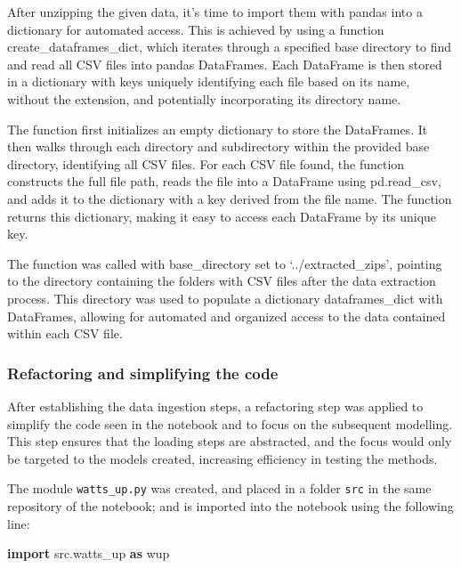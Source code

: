 \documentclass[mstat,12pt]{unswthesis}
\newenvironment{Shaded}{}{}
\newcommand{\ImportTok}[1]{\textcolor[rgb]{0.00,0.50,0.00}{\textbf{#1}}}
\newcommand{\NormalTok}[1]{#1}
\begin{document}
After unzipping the given data, it's time to import them with pandas
into a dictionary for automated access. This is achieved by using a
function create\_dataframes\_dict, which iterates through a specified
base directory to find and read all CSV files into pandas DataFrames.
Each DataFrame is then stored in a dictionary with keys uniquely
identifying each file based on its name, without the extension, and
potentially incorporating its directory name.

The function first initializes an empty dictionary to store the
DataFrames. It then walks through each directory and subdirectory within
the provided base directory, identifying all CSV files. For each CSV
file found, the function constructs the full file path, reads the file
into a DataFrame using pd.read\_csv, and adds it to the dictionary with
a key derived from the file name. The function returns this dictionary,
making it easy to access each DataFrame by its unique key.

The function was called with base\_directory set to
`../extracted\_zips', pointing to the directory containing the folders
with CSV files after the data extraction process. This directory was
used to populate a dictionary dataframes\_dict with DataFrames, allowing
for automated and organized access to the data contained within each CSV
file.

\subsubsection{Refactoring and simplifying the
code}\label{refactoring-and-simplifying-the-code}

After establishing the data ingestion steps, a refactoring step was
applied to simplify the code seen in the notebook and to focus on the
subsequent modelling. This step ensures that the loading steps are
abstracted, and the focus would only be targeted to the models created,
increasing efficiency in testing the methods.

The module \texttt{watts\_up.py} was created, and placed in a folder
\texttt{src} in the same repository of the notebook; and is imported
into the notebook using the following line:

\begin{Shaded}
\begin{Highlighting}[]
\ImportTok{import}\NormalTok{ src.watts\_up }\ImportTok{as}\NormalTok{ wup}
\end{Highlighting}
\end{Shaded}
\end{document}
